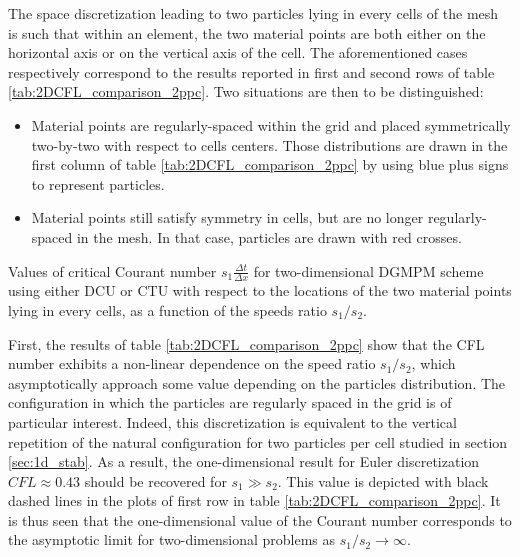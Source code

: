 The space discretization leading to two particles lying in every cells of the mesh is such that within an element, the two material points are both either on the horizontal axis or on the vertical axis of the cell.
The aforementioned cases respectively correspond to the results reported in first and second rows of table \ref{tab:2DCFL_comparison_2ppc}.
Two situations are then to be distinguished:
\begin{itemize}
\item Material points are regularly-spaced within the grid and placed symmetrically two-by-two with respect to cells centers.
  Those distributions are drawn in the first column of table \ref{tab:2DCFL_comparison_2ppc} by using blue plus signs to represent particles.
\item Material points still satisfy symmetry in cells, but are no longer regularly-spaced in the mesh.
  In that case, particles are drawn with red crosses.
\end{itemize}
\begin{table}[h!]
  \centering
  
  \caption{Values of critical Courant number $s_1\frac{\Delta t}{\Delta x}$ for two-dimensional DGMPM scheme using either DCU or CTU with respect to the locations of the two material points lying in every cells, as a function of the speeds ratio $s_1/s_2$.}
  \label{tab:2DCFL_comparison_2ppc}
\end{table}
First, the results of table \ref{tab:2DCFL_comparison_2ppc} show that the CFL number exhibits a non-linear dependence on the speed ratio $s_1/s_2$, which asymptotically approach some value depending on the particles distribution.
The configuration in which the particles are regularly spaced in the grid is of particular interest.
Indeed, this discretization is equivalent to the vertical repetition of the natural configuration for two particles per cell studied in section \ref{sec:1d_stab}.
As a result, the one-dimensional result for Euler discretization $CFL \approx 0.43$ should be recovered for $s_1 \gg s_2$.
This value is depicted with black dashed lines in the plots of first row in table \ref{tab:2DCFL_comparison_2ppc}.
It is thus seen that the one-dimensional value of the Courant number corresponds to the asymptotic limit for two-dimensional problems as $s_1/s_2 \rightarrow \infty$.

